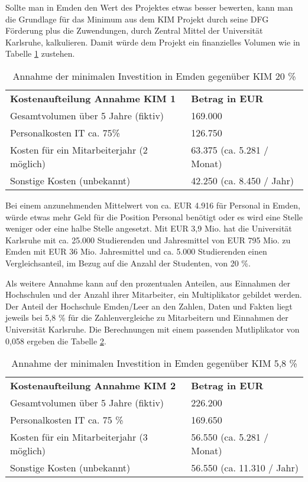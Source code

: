 Sollte man in Emden den Wert des Projektes etwas besser bewerten, kann man die Grundlage für das Minimum aus dem KIM Projekt durch seine DFG Förderung plus die Zuwendungen, durch Zentral Mittel der Universität Karlsruhe, kalkulieren. Damit würde dem Projekt ein finanzielles Volumen wie in Tabelle \ref{tab_kostenaufteilung_emden_KIM1} zustehen.

\begin{table}[h!]
	\begin{tabularx}{\textwidth}{l|l}
		\hline
		\textbf{Kostenaufteilung Annahme KIM 1} & \textbf{Betrag in EUR}\\
		Gesamtvolumen über 5 Jahre (fiktiv) & 169.000\\
		Personalkosten IT ca. 75\% & 126.750\\
		Kosten für ein Mitarbeiterjahr (2 möglich) & 63.375 (ca. 5.281 / Monat)\\ 
		Sonstige Kosten (unbekannt) & 42.250 (ca. 8.450 / Jahr)\\
		\hline
	\end{tabularx}
	\caption{Annahme der minimalen Investition in Emden gegenüber KIM 20 \%}
	\label{tab_kostenaufteilung_emden_KIM1}
\end{table}

Bei einem anzunehmenden Mittelwert von ca. EUR 4.916 für Personal in Emden, würde etwas mehr Geld für die Position Personal benötigt oder es wird eine Stelle weniger oder eine halbe Stelle angesetzt. Mit EUR 3,9 Mio. hat die Universität Karlsruhe mit ca. 25.000 Studierenden und Jahresmittel von EUR 795 Mio.  zu Emden mit EUR 36 Mio. Jahresmittel und ca. 5.000 Studierenden einen Vergleichsanteil, im Bezug auf die Anzahl der Studenten, von 20 \%.


Als weitere Annahme kann auf den prozentualen Anteilen, aus Einnahmen der Hochschulen und der Anzahl ihrer Mitarbeiter,
ein Multiplikator gebildet werden. Der Anteil der Hochschule Emden/Leer an den Zahlen, Daten und Fakten liegt jeweils bei 5,8 \%  für die Zahlenvergleiche zu Mitarbeitern und Einnahmen der Universität Karlsruhe. Die Berechnungen mit einem passenden Mutliplikator von 0,058 ergeben die Tabelle \ref{tab_kostenaufteilung_emden_KIM2}.

\begin{table}[h!]
	\begin{tabularx}{\textwidth}{l|l}
		\hline
		\textbf{Kostenaufteilung Annahme KIM 2} & \textbf{Betrag in EUR}\\
		Gesamtvolumen über 5 Jahre (fiktiv) & 226.200\\
		Personalkosten IT ca. 75 \% & 169.650\\
		Kosten für ein Mitarbeiterjahr (3 möglich) & 56.550 (ca. 5.281 / Monat)\\ 
		Sonstige Kosten (unbekannt) & 56.550 (ca. 11.310 / Jahr)\\
		\hline
	\end{tabularx}
	\caption{Annahme der minimalen Investition in Emden gegenüber KIM 5,8 \%}
	\label{tab_kostenaufteilung_emden_KIM2}
\end{table}

